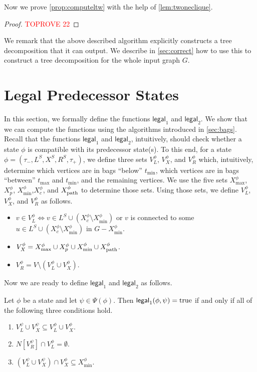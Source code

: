 \documentclass[a4paper,UKenglish,cleveref, autoref, thm-restate, numberwithinsect]{lipics-v2021}
\newcounter{algorithm}
\newcommand{\legal}{\mathsf{legal}}
\newcommand{\dpath}{\textup{path}}
\newcommand{\true}{\textup{true}}
\begin{document}
Now we prove \cref{prop:computeltw} with the help of \cref{lem:twoneclique}.



\begin{proof}\textcolor{red}{TOPROVE 22}\end{proof}

We remark that the above described algorithm explicitly constructs a tree decomposition that it can output. We describe in \cref{sec:correct} how to use this to construct a tree decomposition for the whole input graph $G$.

\section{Legal Predecessor States}\label{sec:legal}

In this section, we formally define the functions $\legal_1$ and $\legal_2$. We show that we can compute the functions using the algorithms introduced in \cref{sec:bags}. Recall that the functions $\legal_1$ and $\legal_2$, intuitively, should check whether a state $\phi$ is compatible with its predecessor state(s). To this end, for a state $\phi=(\tau_-,L^S, X^S, R^S,\tau_+)$, we define three sets $V^\phi_L$, $V^\phi_X$, and $V^\phi_R$ which, intuitively, determine which vertices are in bags ``below'' $t_{\min}$, which vertices are in bags ``between'' $t_{\max}$ and $t_{\min}$, and the remaining vertices.
We use the five sets $X^\phi_{\max}$, $X^\phi_p$, $X^\phi_{\min}$,$X^\phi_c$, and $X^\phi_{\dpath}$ to determine those sets. Using those sets, we define $V^\phi_L$, $V^\phi_X$, and $V^\phi_R$ as follows.
\begin{itemize}
\item $v\in V^\phi_L\Leftrightarrow v\in L^S\cup (X^\phi_c\setminus X^\phi_{\min})$ or $v$ is connected to some $u\in L^S\cup (X^\phi_c\setminus X^\phi_{\min})$ in $G-X^\phi_{\min}$.
\item $V^\phi_X=X^\phi_{\max}\cup X^\phi_p\cup X^\phi_{\min}\cup X^\phi_{\dpath}$.
\item $V^\phi_R=V\setminus (V^\phi_L\cup V^\phi_X)$.
\end{itemize}

Now we are ready to define $\legal_1$ and $\legal_2$ as follows.

\begin{definition}[$\legal_1$]\label{def:legal1}
Let $\phi$ be a state and let $\psi\in\Psi(\phi)$.
Then $\legal_1(\phi,\psi)=\true$ if and only if all of the following three conditions hold.
\begin{enumerate}
\item $V^\psi_L\cup V^\psi_X\subseteq V^\phi_L\cup V^\phi_X$.
\item $N[V^\psi_R]\cap V^\phi_L=\emptyset$.
\item $(V^\psi_L\cup V^\psi_X)\cap V^\phi_X\subseteq X^\phi_{\min}$.
\end{enumerate}
\end{definition}
\end{document}
